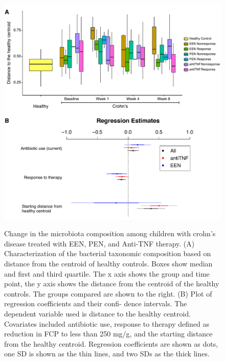 \begin{figure}[p]
\centering
{\includegraphics[scale=0.6,trim=0 0 0 0,clip]{Figure/F24_Distance.pdf}}
\caption[Change in the microbiota composition among children with crohn's disease treated with EEN, PEN, and Anti-TNF therapy]{Change in the microbiota composition among children with crohn's disease treated with EEN, PEN, and Anti-TNF therapy.
(A) Characterization of the bacterial taxonomic composition based on distance from the centroid of healthy controls. Boxes show median and first and third quartile. The x axis shows the group and time point, the y axis shows the distance from the centroid of the healthy controls. The groups compared are shown to the right.
(B) Plot of regression coefficients and their confi- dence intervals. The dependent variable used is distance to the healthy centroid. Covariates included antibiotic use, response to therapy defined as reduction in FCP to less than 250 mg/g, and the starting distance from the healthy centroid. Regression coefficients are shown as dots, one SD is shown as the thin lines, and two SDs as the thick lines.
}
\label{F24_Distance}
\end{figure}




